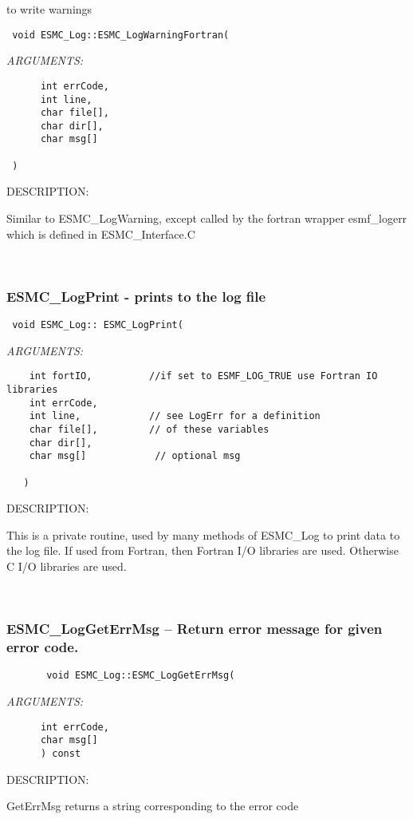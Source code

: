    to write warnings
  
\begin{verbatim} 
 void ESMC_Log::ESMC_LogWarningFortran(
 \end{verbatim}{\em ARGUMENTS:}
\begin{verbatim} 
      int errCode,
      int line,
      char file[],
      char dir[],
      char msg[]
 
 )\end{verbatim}
{\sf DESCRIPTION:\\ }


   Similar to ESMC\_LogWarning, except called by the fortran
   wrapper esmf\_logerr which is
   defined in ESMC\_Interface.C 
 
\mbox{}\hrulefill\ 
 

  \subsubsection [ESMC\_LogPrint] {ESMC\_LogPrint - prints to the log file}


   
\begin{verbatim} 
 void ESMC_Log:: ESMC_LogPrint(
 \end{verbatim}{\em ARGUMENTS:}
\begin{verbatim} 
    int fortIO,          //if set to ESMF_LOG_TRUE use Fortran IO libraries
    int errCode,
    int line,            // see LogErr for a definition
    char file[],         // of these variables
    char dir[],           
    char msg[]            // optional msg
 
   )
 \end{verbatim}
{\sf DESCRIPTION:\\ }

This is a private routine, used by many methods of 
   ESMC\_Log to print data to the log file. If used from Fortran, then
   Fortran I/O libraries are used.  Otherwise C I/O libraries are used. 
 
\mbox{}\hrulefill\ 
 
\subsubsection [ESMC\_LogGetErrMsg] {ESMC\_LogGetErrMsg -- Return error message for given error code.}


  
\begin{verbatim}       void ESMC_Log::ESMC_LogGetErrMsg(
 \end{verbatim}{\em ARGUMENTS:}
\begin{verbatim}      int errCode,
      char msg[]
      ) const\end{verbatim}
{\sf DESCRIPTION:\\ }


   GetErrMsg returns a string corresponding to the error code
  
